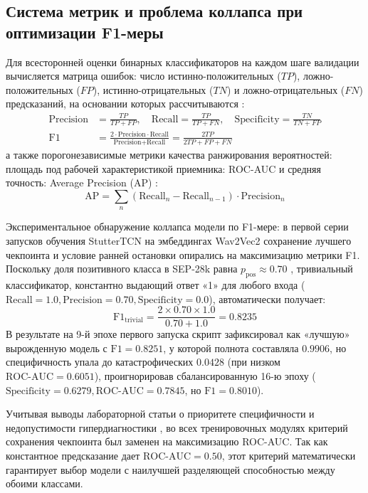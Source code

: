 \documentclass[a4paper,14pt]{extarticle}
\begin{document}
	\subsection{Система метрик и проблема коллапса при оптимизации F1-меры}
	Для всесторонней оценки бинарных классификаторов на каждом шаге валидации вычисляется матрица ошибок: число истинно-положительных ($TP$), ложно-положительных ($FP$), истинно-отрицательных ($TN$) и ложно-отрицательных ($FN$) предсказаний, на основании которых рассчитываются \cite{ivankin}:
	\begin{align}
		\text{Precision} &= \frac{TP}{TP + FP}, \quad \text{Recall} = \frac{TP}{TP + FN}, \quad \text{Specificity} = \frac{TN}{TN + FP} \\
		\text{F1} &= \frac{2 \cdot \text{Precision} \cdot \text{Recall}}{\text{Precision} + \text{Recall}} = \frac{2 TP}{2 TP + FP + FN}
	\end{align}
	а также порогонезависимые метрики качества ранжирования вероятностей: площадь под рабочей характеристикой приемника: ROC-AUC и средняя точность: Average Precision (AP) \cite{ivankin}:
	\begin{equation}
		\text{AP} = \sum_{n} (\text{Recall}_n - \text{Recall}_{n-1}) \cdot \text{Precision}_n
	\end{equation}
	
	Экспериментальное обнаружение коллапса модели по F1-мере: в первой серии запусков обучения StutterTCN на эмбеддингах Wav2Vec2 сохранение лучшего чекпоинта и условие ранней остановки опирались на максимизацию метрики F1. Поскольку доля позитивного класса в SEP-28k равна $p_{\text{pos}} \approx 0.70$ \cite{sep28k}, тривиальный классификатор, константно выдающий ответ «1» для любого входа ($\text{Recall} = 1.0, \text{Precision} = 0.70, \text{Specificity} = 0.0$), автоматически получает:
	\begin{equation}
		\text{F1}_{\text{trivial}} = \frac{2 \times 0.70 \times 1.0}{0.70 + 1.0} = 0.8235
	\end{equation}
	В результате на 9-й эпохе первого запуска скрипт зафиксировал как «лучшую» вырожденную модель с $\text{F1} = 0.8251$, у которой полнота составляла $0.9906$, но специфичность упала до катастрофических $0.0428$ (при низком $\text{ROC-AUC} = 0.6051$), проигнорировав сбалансированную 16-ю эпоху ($\text{Specificity} = 0.6279, \text{ROC-AUC} = 0.7845$, но $\text{F1} = 0.8010$).
	
	Учитывая выводы лабораторной статьи о приоритете специфичности и недопустимости гипердиагностики \cite{ivankin}, во всех тренировочных модулях критерий сохранения чекпоинта был заменен на максимизацию ROC-AUC. Так как константное предсказание дает $\text{ROC-AUC} = 0.50$, этот критерий математически гарантирует выбор модели с наилучшей разделяющей способностью между обоими классами.
	
\end{document}
